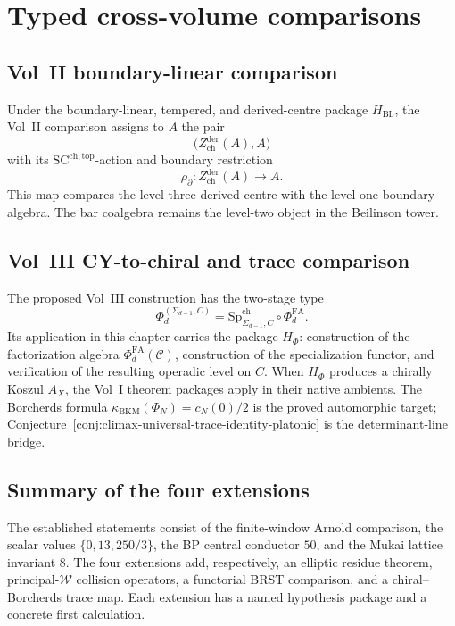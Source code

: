 \section{Typed cross-volume comparisons}
\label{sec:climax-platonic-outlook}

\subsection{Vol~II boundary-linear comparison}
\label{ssec:climax-platonic-volii-bridge}

Under the boundary-linear, tempered, and derived-centre package
\(H_{\mathrm{BL}}\), the Vol~II comparison assigns to \(A\) the pair
\[
 \bigl(Z^{\mathrm{der}}_{\mathrm{ch}}(A),A\bigr)
\]
with its
\(\mathrm{SC}^{\mathrm{ch},\mathrm{top}}\)-action and boundary
restriction
\[
 \rho_\partial\colon Z^{\mathrm{der}}_{\mathrm{ch}}(A)\longrightarrow A.
\]
This map compares the level-three derived centre with the level-one
boundary algebra.  The bar coalgebra remains the level-two object in
the Beilinson tower.

\subsection{Vol~III CY-to-chiral and trace comparison}
\label{ssec:climax-platonic-voliii-bridge}

The proposed Vol~III construction has the two-stage type
\[
 \Phi_d^{(\Sigma_{d-1},C)}
 =
 \mathrm{Sp}^{\mathrm{ch}}_{\Sigma_{d-1},C}
 \circ
 \Phi_d^{\mathrm{FA}}.
\]
Its application in this chapter carries the package \(H_\Phi\):
construction of the factorization algebra
\(\Phi_d^{\mathrm{FA}}(\mathcal C)\), construction of the
specialization functor, and verification of the resulting operadic
level on \(C\).  When \(H_\Phi\) produces a chirally Koszul
\(A_X\), the Vol~I theorem packages apply in their native ambients.
The Borcherds formula
\(\kappa_{\mathrm{BKM}}(\Phi_N)=c_N(0)/2\) is the proved automorphic
target; Conjecture~\ref{conj:climax-universal-trace-identity-platonic}
is the determinant-line bridge.

\subsection{Summary of the four extensions}
\label{ssec:climax-platonic-closing}

The established statements consist of the finite-window Arnold
comparison, the scalar values
\(\{0,13,250/3\}\), the BP central conductor \(50\), and the Mukai
lattice invariant \(8\).  The four extensions add, respectively, an
elliptic residue theorem, principal-\(\mathcal W\) collision
operators, a functorial BRST comparison, and a chiral--Borcherds trace
map.  Each extension has a named hypothesis package and a concrete
first calculation.


